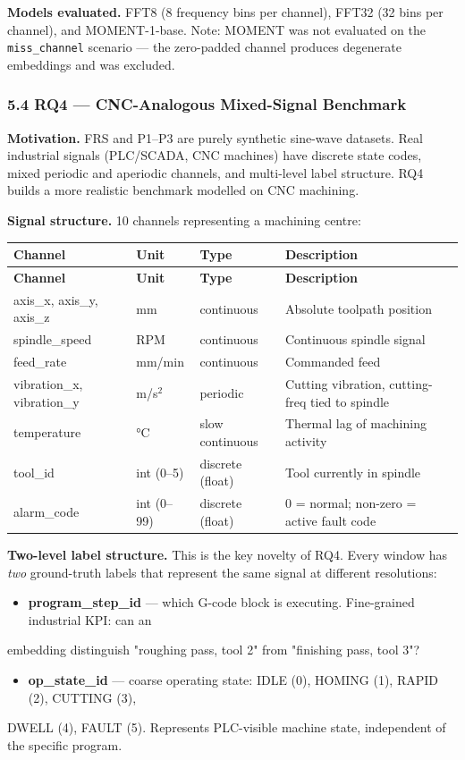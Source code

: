 \documentclass[11pt,a4paper]{article}
\begin{document}
\textbf{Models evaluated.} FFT8 (8 frequency bins per channel), FFT32 (32 bins per channel), and
MOMENT-1-base. Note: MOMENT was not evaluated on the \texttt{miss\_channel} scenario --- the zero-padded
channel produces degenerate embeddings and was excluded.

\subsubsection{5.4 RQ4 --- CNC-Analogous Mixed-Signal Benchmark}

\textbf{Motivation.} FRS and P1--P3 are purely synthetic sine-wave datasets. Real industrial signals
(PLC/SCADA, CNC machines) have discrete state codes, mixed periodic and aperiodic channels, and
multi-level label structure. RQ4 builds a more realistic benchmark modelled on CNC machining.

\textbf{Signal structure.} 10 channels representing a machining centre:

\begin{longtable}{|l|l|l|l|}
\hline
\textbf{Channel} & \textbf{Unit} & \textbf{Type} & \textbf{Description} \\
\hline
\endfirsthead
\hline
\textbf{Channel} & \textbf{Unit} & \textbf{Type} & \textbf{Description} \\
\hline
\endhead
\hline
\endfoot
axis\_x, axis\_y, axis\_z & mm & continuous & Absolute toolpath position \\
\hline
spindle\_speed & RPM & continuous & Continuous spindle signal \\
\hline
feed\_rate & mm/min & continuous & Commanded feed \\
\hline
vibration\_x, vibration\_y & m/s$^2$ & periodic & Cutting vibration, cutting-freq tied to spindle \\
\hline
temperature & °C & slow continuous & Thermal lag of machining activity \\
\hline
tool\_id & int (0--5) & discrete (float) & Tool currently in spindle \\
\hline
alarm\_code & int (0--99) & discrete (float) & 0 = normal; non-zero = active fault code \\
\hline
\end{longtable}

\textbf{Two-level label structure.} This is the key novelty of RQ4. Every window has \textit{two} ground-truth
labels that represent the same signal at different resolutions:

\begin{itemize}
  \item \textbf{program\_step\_id} --- which G-code block is executing. Fine-grained industrial KPI: can an
\end{itemize}
  embedding distinguish "roughing pass, tool 2" from "finishing pass, tool 3"?
\begin{itemize}
  \item \textbf{op\_state\_id} --- coarse operating state: IDLE (0), HOMING (1), RAPID (2), CUTTING (3),
\end{itemize}
  DWELL (4), FAULT (5). Represents PLC-visible machine state, independent of the specific program.
\end{document}

